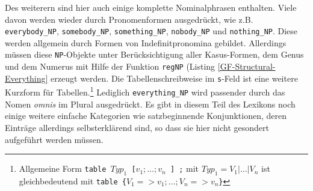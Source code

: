 Des weiterern sind hier auch einige komplette Nominalphrasen enthalten. Viele davon werden wieder durch Pronomenformen ausgedrückt, wie z.B. \texttt{everybody\_NP}, \texttt{somebody\_NP}, \texttt{something\_NP}, \texttt{nobody\_NP} und \texttt{nothing\_NP}. Diese werden allgemein durch Formen von Indefinitpronomina gebildet. Allerdings müssen diese \texttt{NP}-Objekte unter Berücksichtigung aller Kasus-Formen, dem Genus und dem Numerus mit Hilfe der Funktion \texttt{regNP} (Listing \ref{GF-Structural-Everything} erzeugt werden. Die Tabellenschreibweise im \texttt{s}-Feld ist eine weitere Kurzform für Tabellen.\footnote{Allgemeine Form \texttt{table $Typ_1$ [$v_1 ; \dots ; v_n$ ] ;} mit $Typ_1=V_1| \dots |V_n$ ist gleichbedeutend mit \texttt{table \{$V_1 => v_1 ; \dots ; V_n => v_n$\}}} Lediglich \texttt{everything\_NP} wird passender durch das Nomen \textit{omnis} im Plural ausgedrückt.
Es gibt in diesem Teil des Lexikons noch einige weitere einfache Kategorien wie satzbeginnende Konjunktionen, deren Einträge allerdings selbsterklärend sind, so dass sie hier nicht gesondert aufgeführt werden müssen.
\FloatBarrier
